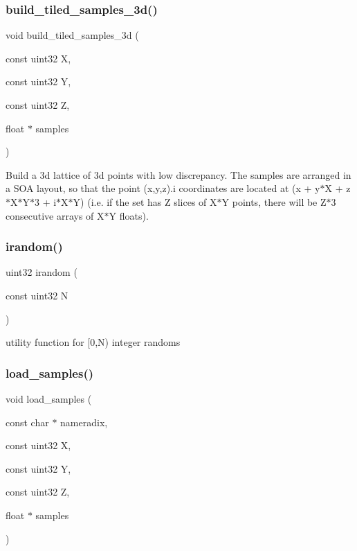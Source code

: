 \subsubsection{\texorpdfstring{build\+\_\+tiled\+\_\+samples\+\_\+3d()}{build\_tiled\_samples\_3d()}}
{\footnotesize\ttfamily void build\+\_\+tiled\+\_\+samples\+\_\+3d (\begin{DoxyParamCaption}\item[{const uint32}]{X,  }\item[{const uint32}]{Y,  }\item[{const uint32}]{Z,  }\item[{float $\ast$}]{samples }\end{DoxyParamCaption})\hspace{0.3cm}{\ttfamily [inline]}}

Build a 3d lattice of 3d points with low discrepancy. The samples are arranged in a S\+OA layout, so that the point (x,y,z).i coordinates are located at (x + y$\ast$X + z$\ast$\+X$\ast$\+Y$\ast$3 + i$\ast$\+X$\ast$Y) (i.\+e. if the set has Z slices of X$\ast$Y points, there will be Z$\ast$3 consecutive arrays of X$\ast$Y floats). \mbox{\label{group___sampling_ga60d3362a11c556fce4eaf7e9989b119a}} 
\subsubsection{\texorpdfstring{irandom()}{irandom()}}
{\footnotesize\ttfamily uint32 irandom (\begin{DoxyParamCaption}\item[{const uint32}]{N }\end{DoxyParamCaption})\hspace{0.3cm}{\ttfamily [inline]}}

utility function for \mbox{[}0,N) integer randoms \mbox{\label{group___sampling_gac2c10d84fc3ae4eab94ebad2c1e72e99}} 
\subsubsection{\texorpdfstring{load\+\_\+samples()}{load\_samples()}}
{\footnotesize\ttfamily void load\+\_\+samples (\begin{DoxyParamCaption}\item[{const char $\ast$}]{nameradix,  }\item[{const uint32}]{X,  }\item[{const uint32}]{Y,  }\item[{const uint32}]{Z,  }\item[{float $\ast$}]{samples }\end{DoxyParamCaption})\hspace{0.3cm}{\ttfamily [inline]}}

